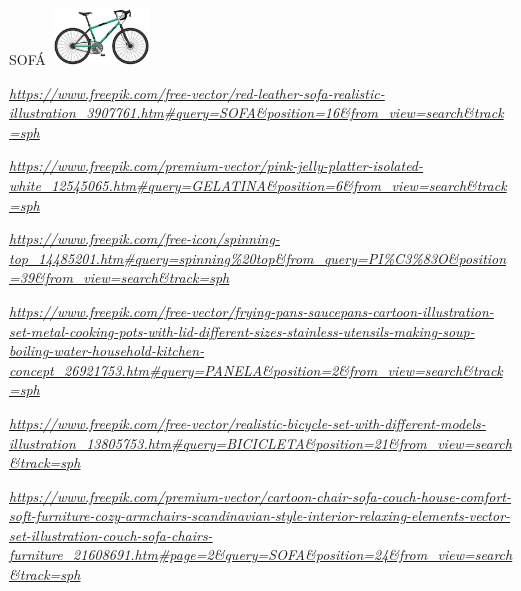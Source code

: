 SOFÁ\includegraphics[width=1.16667in,height=0.59375in]{media/image48.png}

\href{https://www.freepik.com/free-vector/red-leather-sofa-realistic-illustration_3907761.htm\#query=SOFA\&position=16\&from_view=search\&track=sph}{\emph{https://www.freepik.com/free-vector/red-leather-sofa-realistic-illustration\_3907761.htm\#query=SOFA\&position=16\&from\_view=search\&track=sph}}

\href{https://www.freepik.com/premium-vector/pink-jelly-platter-isolated-white_12545065.htm\#query=GELATINA\&position=6\&from_view=search\&track=sph}{\emph{https://www.freepik.com/premium-vector/pink-jelly-platter-isolated-white\_12545065.htm\#query=GELATINA\&position=6\&from\_view=search\&track=sph}}

\href{https://www.freepik.com/free-icon/spinning-top_14485201.htm\#query=spinning\%20top\&from_query=PI\%C3\%83O\&position=39\&from_view=search\&track=sph}{\emph{https://www.freepik.com/free-icon/spinning-top\_14485201.htm\#query=spinning\%20top\&from\_query=PI\%C3\%83O\&position=39\&from\_view=search\&track=sph}}

\href{https://www.freepik.com/free-vector/frying-pans-saucepans-cartoon-illustration-set-metal-cooking-pots-with-lid-different-sizes-stainless-utensils-making-soup-boiling-water-household-kitchen-concept_26921753.htm\#query=PANELA\&position=2\&from_view=search\&track=sph}{\emph{https://www.freepik.com/free-vector/frying-pans-saucepans-cartoon-illustration-set-metal-cooking-pots-with-lid-different-sizes-stainless-utensils-making-soup-boiling-water-household-kitchen-concept\_26921753.htm\#query=PANELA\&position=2\&from\_view=search\&track=sph}}

\href{https://www.freepik.com/free-vector/realistic-bicycle-set-with-different-models-illustration_13805753.htm\#query=BICICLETA\&position=21\&from_view=search\&track=sph}{\emph{https://www.freepik.com/free-vector/realistic-bicycle-set-with-different-models-illustration\_13805753.htm\#query=BICICLETA\&position=21\&from\_view=search\&track=sph}}

\href{https://www.freepik.com/premium-vector/cartoon-chair-sofa-couch-house-comfort-soft-furniture-cozy-armchairs-scandinavian-style-interior-relaxing-elements-vector-set-illustration-couch-sofa-chairs-furniture_21608691.htm\#page=2\&query=SOFA\&position=24\&from_view=search\&track=sph}{\emph{https://www.freepik.com/premium-vector/cartoon-chair-sofa-couch-house-comfort-soft-furniture-cozy-armchairs-scandinavian-style-interior-relaxing-elements-vector-set-illustration-couch-sofa-chairs-furniture\_21608691.htm\#page=2\&query=SOFA\&position=24\&from\_view=search\&track=sph}}

